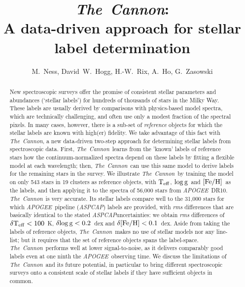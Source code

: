 \documentclass[12pt, preprint]{aastex}
\newcommand{\tc}{\textsl{The~Cannon}}
\newcommand{\apogee}{\textsl{APOGEE}}
\newcommand{\aspcap}{\textsl{ASPCAP}}
\newcommand{\teff}{\mbox{$\rm T_{eff}$}}
\newcommand{\feh}{\mbox{$\rm [Fe/H]$}}
\newcommand{\logg}{\mbox{$\rm \log g$}}
\begin{document}
\title{\tc:\\ A data-driven approach for stellar label determination}
\author{M.~Ness,  
David~W.~Hogg, 
H.-W.~Rix, 
A.~Ho, 
G.~Zasowski}

\begin{abstract}%
New spectroscopic surveys offer the promise of consistent stellar
parameters and abundances (`stellar labels') for hundreds of thousands
of stars in the Milky Way.
These labels are usually derived by comparisons with physics-based
model spectra, which are technically challenging, and often use only a
modest fraction of the spectral pixels.
In many cases, however, there is a sub-set of \emph{reference}
objects for which the stellar labels are known with high(er)
fidelity. We take advantage of this fact with \tc , a new data-driven
two-step approach for determining
stellar labels from spectroscopic data.
First, \tc\ learns from the 'known' labels of reference stars 
how the continuum-normalized spectra depend on these labels
by fitting a flexible model at each wavelength;
then,  \tc\ can use this same model to derive labels for the remaining stars in the survey.
We illustrate \tc\ by training the model on only 543 stars in 19 clusters
as reference objects, with \teff, \logg\ and \feh\ as the labels,
and then applying it to the spectra of 56,000 stars from
\apogee\ DR10.
\tc\ is very accurate. Its stellar labels compare well to the 31,000
stars for which \apogee\ pipeline (\aspcap) labels are provided, with 
\textit{rms} differences that are basically identical to the stated \aspcap uncertainties:
we obtain \textit{rms} differences of $\delta\teff< 100$~K, $\delta\logg< 0.2$~dex
and $\delta\feh< 0.1$~dex.
Aside from taking the labels of reference objects, \tc\ makes no use of
stellar models nor any line-list; but it
requires that the set of reference objects spans the label-space.
\tc\  performs well at lower signal-to-noise, as it delivers comparably 
good labels even at one ninth the \apogee\ observing time.
We discuss the limitations of \tc\ and its future potential, in particular
to bring different spectroscopic surveys onto a consistent
scale of stellar labels if they have sufficient objects in common.
\end{abstract}
\end{document}
